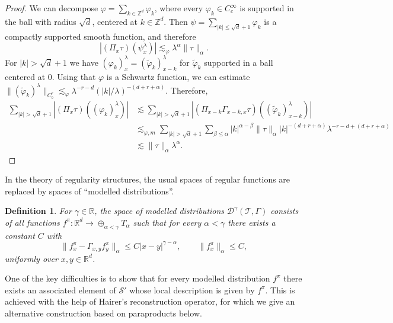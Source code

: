 \documentclass[a4paper,11pt]{article}
\newtheorem{definition}[theorem]{Definition}
\theoremstyle{remark}
\newcommand{\R}{\mathbb{R}}
\newcommand{\Z}{\mathbb{Z}}
\newcommand{\CS}{\ensuremath{\mathscr{S}}}
\begin{document}
\begin{proof}
   We can decompose $\varphi = \sum_{k \in \Z^d} \varphi_k$, where every $\varphi_k \in C^\infty_c$ is supported in the ball with radius $\sqrt{d}$, centered at $k \in \Z^d$. Then $\psi = \sum_{|k|\leqslant \sqrt{d}+1} \varphi_k$ is a compactly supported smooth function, and therefore
   \[
      |(\Pi_x \tau)(\psi^\lambda_x)| \lesssim_\varphi \lambda^{\alpha} \| \tau\|_\alpha.
   \]
   For $|k|>\sqrt{d}+1$ we have $(\varphi_k)^\lambda_x = (\widetilde{\varphi}_k)^\lambda_{x-k}$ for $\widetilde{\varphi}_k$ supported in a ball centered at 0. Using that $\varphi$ is a Schwartz function, we can estimate $\|(\widetilde\varphi_k)^\lambda\|_{C^r_b}\lesssim_{\varphi} \lambda^{-r-d} (|k|/\lambda)^{-(d+r+\alpha)}$. Therefore,
   \begin{align*}
      \sum_{|k| > \sqrt{d} + 1}  |(\Pi_x \tau)((\varphi_k)^\lambda_x)| & \lesssim \sum_{|k| > \sqrt{d} + 1}  |(\Pi_{x-k} \Gamma_{x-k,x} \tau)((\widetilde \varphi_k)^\lambda_{x-k})| \\
      &\lesssim_{\varphi,m} \sum_{|k| > \sqrt{d} + 1} \sum_{\beta\leqslant\alpha} |k|^{\alpha-\beta} \|\tau\|_\alpha |k|^{-(d+r+\alpha)} \lambda^{-r-d+(d+r+\alpha)} \\
      &\lesssim \|\tau\|_\alpha \lambda^\alpha.
   \end{align*}
\end{proof}

In the theory of regularity structures, the usual spaces of regular functions are replaced by spaces of ``modelled distributions''.

\begin{definition}
  For $\gamma \in \R$, the space of {\em modelled distributions} $\mathcal{D}^{\gamma} ( \mathcal{T}, \Gamma )$ consists of all
  functions $f^{\pi}\colon \R^{d} \rightarrow \oplus_{\alpha < \gamma}
  T_{\alpha}$ such that for every $\alpha  < \gamma$ there exists a constant $C$ with
  \[
     \| f^{\pi}_{x} - \Gamma_{x,y} f^{\pi}_{y} \|_{\alpha} \leqslant C | x-y |^{\gamma - \alpha}, \qquad \|f^\pi_x \|_\alpha \leqslant C,
  \]
  uniformly over $x,y \in \R^d$.
\end{definition}

One of the key difficulties is to show that for every modelled distribution $f^\pi$ there exists an associated element of $\CS'$ whose local description is given by $f^\pi$. This is achieved with the help of Hairer's reconstruction operator, for which we give an alternative construction based on paraproducts below.
\end{document}
